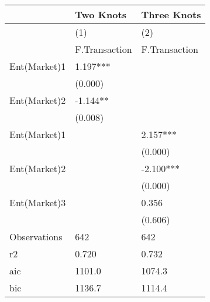 \begin{table}[]
\centering
\begin{tabular}{@{}lll@{}}
\toprule
             & Two Knots     & Three Knots   \\ \midrule
             & (1)           & (2)           \\
             & F.Transaction & F.Transaction \\
Ent(Market)1 & 1.197***      &               \\
             & (0.000)       &               \\
Ent(Market)2 & -1.144**      &               \\
             & (0.008)       &               \\
Ent(Market)1 &               & 2.157***      \\
             &               & (0.000)       \\
Ent(Market)2 &               & -2.100***     \\
             &               & (0.000)       \\
Ent(Market)3 &               & 0.356         \\
             &               & (0.606)       \\
Observations & 642           & 642           \\
r2           & 0.720         & 0.732         \\
aic          & 1101.0        & 1074.3        \\
bic          & 1136.7        & 1114.4        \\ \bottomrule
\end{tabular}
\end{table}